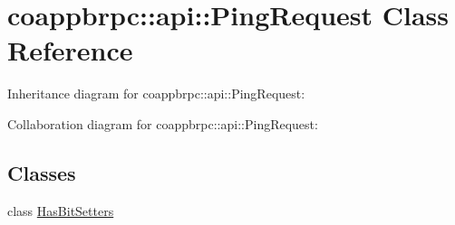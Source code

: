 \hypertarget{classcoappbrpc_1_1api_1_1PingRequest}{}\section{coappbrpc\+:\+:api\+:\+:Ping\+Request Class Reference}
\label{classcoappbrpc_1_1api_1_1PingRequest}


Inheritance diagram for coappbrpc\+:\+:api\+:\+:Ping\+Request\+:


Collaboration diagram for coappbrpc\+:\+:api\+:\+:Ping\+Request\+:
\subsection*{Classes}
\begin{DoxyCompactItemize}
\item 
class \hyperlink{classcoappbrpc_1_1api_1_1PingRequest_1_1HasBitSetters}{Has\+Bit\+Setters}
\end{DoxyCompactItemize}
